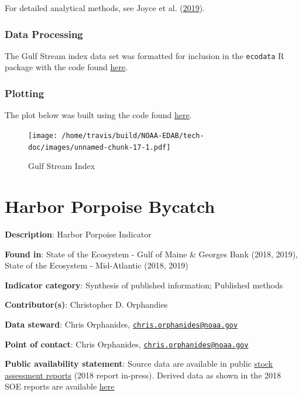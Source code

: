 \documentclass[
]{book}
\begin{document}
For detailed analytical methods, see Joyce et al. (\protect\hyperlink{ref-joyce2019}{2019}).

\hypertarget{data-processing-11}{%
\subsection{Data Processing}\label{data-processing-11}}

The Gulf Stream index data set was formatted for inclusion in the \texttt{ecodata} R package with the code found \href{https://github.com/NOAA-EDAB/ecodata/blob/master/data-raw/get_gsi.R}{here}.

\hypertarget{plotting-9}{%
\subsection{Plotting}\label{plotting-9}}

The plot below was built using the code found
\href{https://github.com/NOAA-EDAB/ecodata/blob/master/chunk-scripts/LTL.Rmd-GSI.R}{here}.

\begin{figure}
\centering
\texttt{[image: /home/travis/build/NOAA-EDAB/tech-doc/images/unnamed-chunk-17-1.pdf]}
\caption{\label{fig:unnamed-chunk-17}Gulf Stream Index}
\end{figure}

\hypertarget{harbor-porpoise-bycatch}{%
\chapter{Harbor Porpoise Bycatch}\label{harbor-porpoise-bycatch}}

\textbf{Description}: Harbor Porpoise Indicator

\textbf{Found in}: State of the Ecosystem - Gulf of Maine \& Georges Bank (2018, 2019), State of the Ecosystem - Mid-Atlantic (2018, 2019)

\textbf{Indicator category}: Synthesis of published information; Published methods

\textbf{Contributor(s)}: Christopher D. Orphandies

\textbf{Data steward}: Chris Orphanides, \href{mailto:chris.orphanides@noaa.gov}{\nolinkurl{chris.orphanides@noaa.gov}}

\textbf{Point of contact}: Chris Orphanides, \href{mailto:chris.orphanides@noaa.gov}{\nolinkurl{chris.orphanides@noaa.gov}}

\textbf{Public availability statement}: Source data are available in public \href{https://www.fisheries.noaa.gov/national/marine-mammal-protection/marine-mammal-stock-assessment-reports-region}{stock assessment reports} (2018 report in-press). Derived data as shown in the 2018 SOE reports are available \href{http://comet.nefsc.noaa.gov/erddap/tabledap/protected_species_soe_v1.html}{here}
\end{document}
